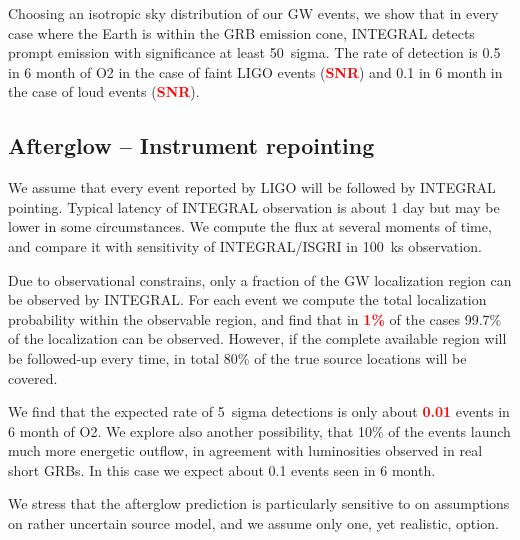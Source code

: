 \documentclass[a0,portrait]{a0poster}
\newcommand{\vs}[1] {\textbf{\textcolor{red}{#1}}}
\begin{document}
\begin{multicols}{2}
\begin{center}
    \label{covered_region}
\end{center}

Choosing an isotropic sky distribution of our GW events, we show that
in every case where the Earth is within the GRB emission cone,
INTEGRAL detects prompt emission with significance at least 50~sigma.
The rate of detection is 0.5 in 6 month of O2 in the case of faint
LIGO events (\vs{SNR}) and 0.1 in 6 month in the case of loud events
(\vs{SNR}).

\subsection*{Afterglow -- Instrument repointing}


We assume that every event reported by LIGO will be followed by
INTEGRAL pointing. Typical latency of INTEGRAL observation is about 1
day but may be lower in some circumstances. We compute the flux at
several moments of time, and compare it with sensitivity of
INTEGRAL/ISGRI in 100~ks observation.

Due to observational constrains, only a fraction of the GW localization
region can be observed by INTEGRAL. For each event we compute the
total localization probability within the observable region, and find
that in \vs{1\%} of the cases 99.7\% of the localization can be
observed. However, if the complete available region will be followed-up
every time, in total 80\% of the true source locations will be
covered.

We find that the expected rate of 5~sigma detections is only about
\vs{0.01} events in 6 month of O2. We explore also another
possibility, that 10\% of the events launch much more energetic
outflow, in agreement with luminosities observed in real short
GRBs. In this case we expect about 0.1 events seen in 6 month. 

We stress that the afterglow prediction is particularly sensitive to
on assumptions on rather uncertain source model, and we assume only
one, yet realistic, option.


\end{multicols}
\end{document}
